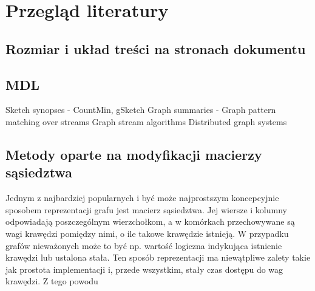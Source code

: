 \chapter{Przegląd literatury}

\section{Rozmiar i układ treści na stronach dokumentu}

\section{MDL}

Sketch synopses - CountMin, gSketch
Graph summaries - 
Graph pattern matching over streams
Graph stream algorithms
Distributed graph systems

\section{Metody oparte na modyfikacji macierzy sąsiedztwa}
    Jednym z najbardziej popularnych i być może najprostszym koncepcyjnie sposobem reprezentacji grafu jest macierz sąsiedztwa. Jej wiersze i kolumny odpowiadają poszczególnym wierzchołkom, a w komórkach przechowywane są wagi krawędzi pomiędzy nimi, o ile takowe krawędzie istnieją. W przypadku grafów nieważonych może to być np. wartość logiczna indykująca istnienie krawędzi lub ustalona stała. Ten sposób reprezentacji ma niewątpliwe zalety takie jak prostota implementacji i, przede wszystkim, stały czas dostępu do wag krawędzi. Z tego powodu     

